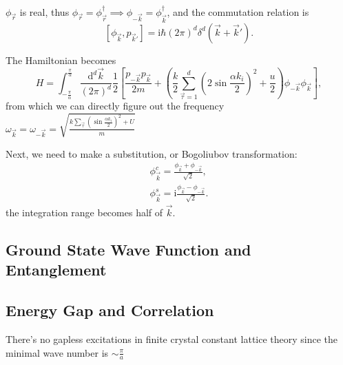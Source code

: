 $\phi_{\vec{r}}$ is real, thus $\phi_{\vec{r}} = \phi_{\vec{r}}^\dagger \implies \phi_{-\vec{k}} = \phi_{\vec{k}}^\dagger$, and the commutation relation is
\begin{equation}
  \left[ \phi_{\vec{k}}, p_{\vec{k}'} \right] = \mathrm{i} \hbar (2\pi)^d \delta^{d}(\vec{k} + \vec{k}').
\end{equation}

The Hamiltonian becomes
\begin{equation}
  H = \int_{-\frac{\pi}{\alpha}}^{\frac{\pi}{\alpha}} \frac{\mathrm{d} ^d \vec{k}}{(2\pi)^d}\frac{1}{2}
  \left[ 
    \frac{p_{-\vec{k}}p_{\vec{k}}}{2m} + \left( \frac{k}{2} \sum_{\vec{\tau} = 1}^d \left( 2 \sin \frac{\alpha k_i}{2} \right) ^2 + \frac{u}{2}  \right) \phi_{-\vec{k}}\phi_{\vec{k}}
   \right] ,
\end{equation}
from which we can directly figure out the frequency $\omega_{\vec{k}} = \omega_{-\vec{k}} = \sqrt{\frac{k \sum_{\vec{\tau}} \left( \sin \frac{\alpha k_i}{2} \right) ^2 + U}{m}}$

Next, we need to make a substitution, or Bogoliubov transformation:
\begin{align}
  \phi_{\vec{k}}^c = \frac{\phi_{\vec{k}}+\phi_{-\vec{k}}}{\sqrt{2}},
  \\
  \phi_{\vec{k}}^s = \mathrm{i} \frac{\phi_{\vec{k}} - \phi_{-\vec{k}}}{\sqrt{2}}.
\end{align}
the integration range becomes half of $\vec{k}$.




\subsection{Ground State Wave Function and Entanglement}

\subsection{Energy Gap and Correlation}
There's no gapless excitations in finite crystal constant lattice theory since the minimal wave number is $\sim  \frac{\pi}{a}$